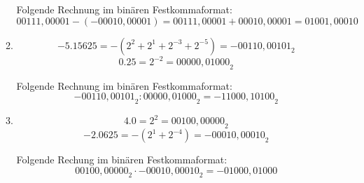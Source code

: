 \documentclass[DIN, pagenumber=false, fontsize=11pt, parskip=half]{scrartcl}
\begin{document}
\begin{enumerate}[label=(\alph*)]
\begin{enumerate}[label=(\roman*)]
                    Folgende Rechnung im binären Festkommaformat:
                    \begin{equation*}
                        00111,00001 - (-00010,00001) = 00111,00001 + 00010,00001 = 01001,00010
                    \end{equation*}

                \item 
                    \begin{equation*}
                        -5.15625 = -(2^2 + 2^1 + 2^{-3} + 2^{-5}) = -{00110,00101}_2
                    \end{equation*}
                    \begin{equation*}
                        0.25 = 2^{-2} = {00000,01000}_2
                    \end{equation*}

                    Folgende Rechnung im binären Festkommaformat:
                    \begin{equation*}
                        -{00110,00101}_2 : {00000,01000}_2 = -{11000,10100}_2
                    \end{equation*}

                \item
                    \begin{equation*}
                        4.0 = 2^2 = {00100,00000}_2
                    \end{equation*}
                    \begin{equation*}
                        -2.0625 = -(2^1 + 2^{-4}) = -{00010,00010}_2
                    \end{equation*}

                    Folgende Rechung im binären Festkommaformat:
                    \begin{equation*}
                        {00100,00000}_2 \cdot -{00010,00010}_2 = -{01000,01000}
                    \end{equation*}
            \end{enumerate}
    \end{enumerate}
\end{document}
